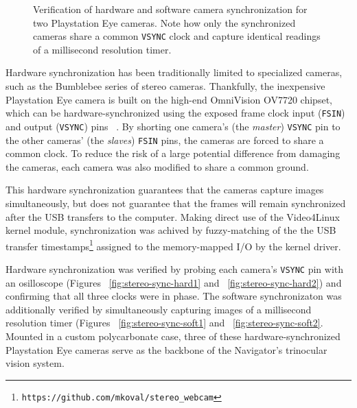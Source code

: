 \documentclass[11pt,twocolumn]{article}
\begin{document}
\begin{figure*}
	\centering
	\caption{
		Verification of hardware and software camera synchronization for two
		Playstation Eye cameras. Note how only the synchronized cameras share a
		common \texttt{VSYNC} clock and capture identical readings of a
		millisecond resolution timer.
	}
	\label{fig:stereo-sync}
\end{figure*}

Hardware synchronization has been traditionally limited to specialized cameras,
such as the Bumblebee series of stereo cameras. Thankfully, the inexpensive
Playstation Eye camera is built on the high-end OmniVision OV7720 chipset,
which can be hardware-synchronized using the exposed frame clock input
(\texttt{FSIN}) and output (\texttt{VSYNC}) pins ~\cite{omnivision}. By
shorting one camera's (the \textit{master}) \texttt{VSYNC} pin to the other
cameras' (the \textit{slaves}) \texttt{FSIN} pins, the cameras are forced to
share a common clock. To reduce the risk of a large potential difference from
damaging the cameras, each camera was also modified to share a common ground.

This hardware synchronization guarantees that the cameras capture images
simultaneously, but does not guarantee that the frames will remain synchronized
after the USB transfers to the computer. Making direct use of the Video4Linux
kernel module, synchronization was achived by fuzzy-matching of the the USB
transfer timestamps\footnote{\texttt{https://github.com/mkoval/stereo\_webcam}}
assigned to the memory-mapped I/O by the kernel driver.

Hardware synchronization was verified by probing each camera's \texttt{VSYNC}
pin with an osilloscope (Figures ~\ref{fig:stereo-sync-hard1} and
~\ref{fig:stereo-sync-hard2}) and confirming that all three clocks were in
phase. The software synchronizaton was additionally verified by simultaneously
capturing images of a millisecond resolution timer (Figures
~\ref{fig:stereo-sync-soft1} and ~\ref{fig:stereo-sync-soft2}. Mounted in a
custom polycarbonate case, three of these hardware-synchronized Playstation Eye
cameras serve as the backbone of the Navigator's trinocular vision system.
\end{document}
